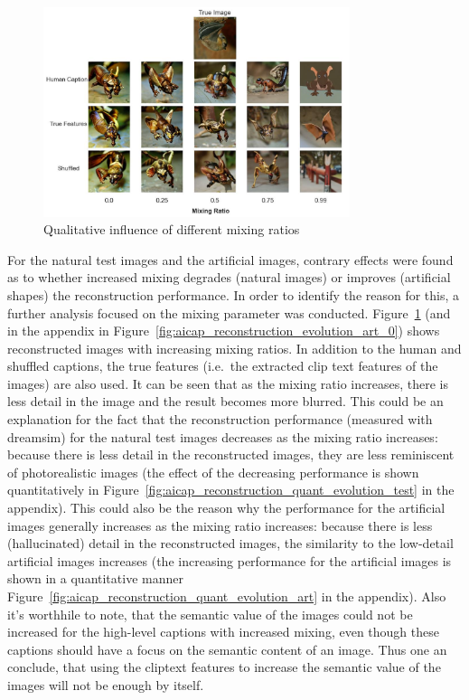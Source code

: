 \begin{figure}[ht]
    \centering
    \includegraphics[width=0.8\textwidth]{plots/aicap_reconstruction_evolution_test_0.JPEG}
    \caption{Qualitative influence of different mixing ratios}\label{fig:aicap_reconstruction_evolution_test_0}
\end{figure}

For the natural test images and the artificial images, contrary effects were found as to whether increased mixing degrades (natural images) or improves (artificial shapes) the reconstruction performance. In order to identify the reason for this, a further analysis focused on the mixing parameter was conducted. Figure~\ref{fig:aicap_reconstruction_evolution_test_0} (and in the appendix in Figure~\ref{fig:aicap_reconstruction_evolution_art_0}) shows reconstructed images with increasing mixing ratios. In addition to the human and shuffled captions, the true features (i.e.\ the extracted clip text features of the images) are also used. It can be seen that as the mixing ratio increases, there is less detail in the image and the result becomes more blurred. This could be an explanation for the fact that the reconstruction performance (measured with dreamsim) for the natural test images decreases as the mixing ratio increases: because there is less detail in the reconstructed images, they are less reminiscent of photorealistic images (the effect of the decreasing performance is shown quantitatively in Figure~\ref{fig:aicap_reconstruction_quant_evolution_test} in the appendix). This could also be the reason why the performance for the artificial images generally increases as the mixing ratio increases: because there is less (hallucinated) detail in the reconstructed images, the similarity to the low-detail artificial images increases (the increasing performance for the artificial images is shown in a quantitative manner Figure~\ref{fig:aicap_reconstruction_quant_evolution_art} in the appendix). Also it's worthhile to note, that the semantic value of the images could not be increased for the high-level captions with increased mixing, even though these captions should have a focus on the semantic content of an image. Thus one an conclude, that using the cliptext features to increase the semantic value of the images will not be enough by itself.

